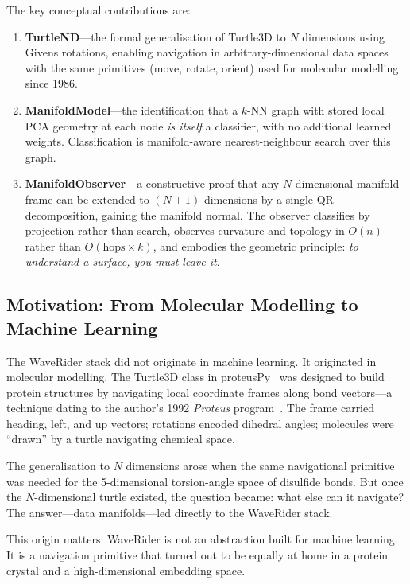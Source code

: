 \documentclass[12pt,letterpaper]{article}
\begin{document}
The key conceptual contributions are:

\begin{enumerate}[leftmargin=*]
\item \textbf{TurtleND}---the formal generalisation of Turtle3D to $N$
  dimensions using Givens rotations, enabling navigation in
  arbitrary-dimensional data spaces with the same primitives (move, rotate,
  orient) used for molecular modelling since 1986.

\item \textbf{ManifoldModel}---the identification that a $k$-NN graph with
  stored local PCA geometry at each node \emph{is itself} a classifier, with no
  additional learned weights.  Classification is manifold-aware nearest-neighbour
  search over this graph.

\item \textbf{ManifoldObserver}---a constructive proof that any $N$-dimensional
  manifold frame can be extended to $(N+1)$ dimensions by a single QR
  decomposition, gaining the manifold normal.  The observer classifies by
  projection rather than search, observes curvature and topology in $O(n)$
  rather than $O(\text{hops} \times k)$, and embodies the geometric principle:
  \emph{to understand a surface, you must leave it}.
\end{enumerate}

\subsection{Motivation: From Molecular Modelling to Machine Learning}

The WaveRider stack did not originate in machine learning.  It originated in
molecular modelling.  The Turtle3D class in
proteusPy~\cite{suchanek24joss} was designed to build protein structures by
navigating local coordinate frames along bond vectors---a technique dating to the
author's 1992 \emph{Proteus} program~\cite{suchanek92}.  The frame carried
heading, left, and up vectors; rotations encoded dihedral angles; molecules were
``drawn'' by a turtle navigating chemical space.

The generalisation to $N$ dimensions arose when the same navigational primitive
was needed for the 5-dimensional torsion-angle space of disulfide bonds.  But
once the $N$-dimensional turtle existed, the question became: what else can it
navigate?  The answer---data manifolds---led directly to the WaveRider stack.

This origin matters: WaveRider is not an abstraction built for machine learning.
It is a navigation primitive that turned out to be equally at home in a protein
crystal and a high-dimensional embedding space.
\end{document}
